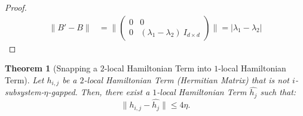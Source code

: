 \documentclass[11pt]{article}
\theoremstyle{plain}
\newtheorem{theorem}{Theorem}[section]
\begin{document}
\begin{proof}
\begin{align*}
\|B' - B \| &= \|\begin{pmatrix}
        0 & 0\\ 0 & \left(\lambda_1 - \lambda_2\right)\: I_{d \times d}
    \end{pmatrix}\| = |\lambda_1 - \lambda_2|
\end{align*}
\end{proof}

\begin{theorem}[Snapping a $2$-local Hamiltonian Term into $1$-local Hamiltonian Term]
\label{thm:snapping-2-local-hamiltonian-term}
    Let $h_{i,j}$ be a $2$-local Hamiltonian Term (Hermitian Matrix) that is not $i$-subsystem-$\eta$-gapped. Then, there exist a $1$-local Hamiltonian Term $\widehat{h_{j}}$ such that:
    \begin{equation}
    \label{eqn:snapped-distance-between-hamiltonian-terms}
        \|h_{i,j} - \widehat{h_{j}}\| \leq 4 \eta.
    \end{equation}
\end{theorem}
\end{document}
